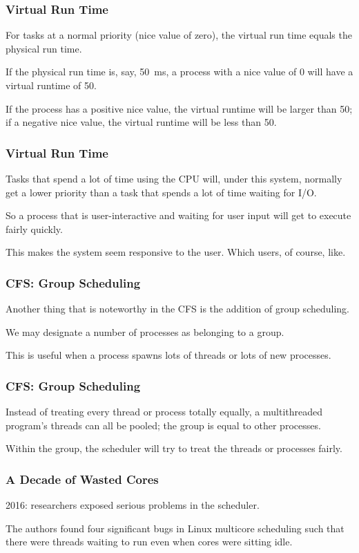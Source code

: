 \begin{frame}
\frametitle{Virtual Run Time}

For tasks at a normal priority (nice value of zero), the virtual run time equals the physical run time. 

If the physical run time is, say, 50~ms, a process with a nice value of 0 will have a virtual runtime of 50. 

If the process has a positive nice value, the virtual runtime will be larger than 50; if a negative nice value, the virtual runtime will be less than 50.

\end{frame}



\begin{frame}
\frametitle{Virtual Run Time}

Tasks that spend a lot of time using the CPU will, under this system, normally get a lower priority than a task that spends a lot of time waiting for I/O.

So a process that is user-interactive and waiting for user input will get to execute fairly quickly.

This makes the system seem responsive to the user. Which users, of course, like.

\end{frame}

\begin{frame}
\frametitle{CFS: Group Scheduling}

Another thing that is noteworthy in the CFS is the addition of group scheduling. 

We may designate a number of processes as belonging to a group. 

This is useful when a process spawns lots of threads or lots of new processes. 


\end{frame}

\begin{frame}
\frametitle{CFS: Group Scheduling}

Instead of treating every thread or process totally equally, a multithreaded program's threads can all be pooled; the group is equal to other processes. 

Within the group, the scheduler will try to treat the threads or processes fairly.

\end{frame}




\begin{frame}
\frametitle{A Decade of Wasted Cores}

2016: researchers exposed serious problems in the scheduler. 

The authors found four significant bugs in Linux multicore scheduling such that there were threads waiting to run even when cores were sitting idle. 

\end{frame}




